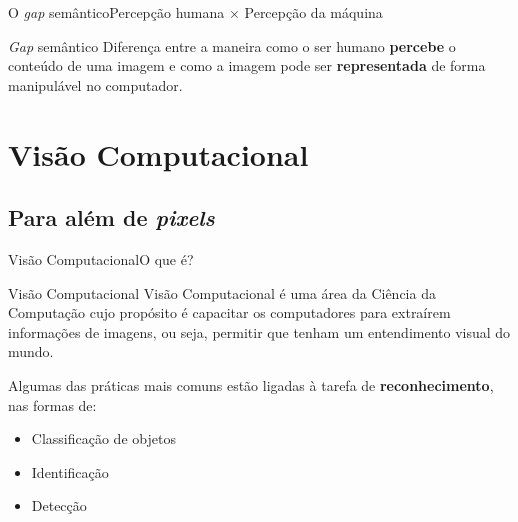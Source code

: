 \documentclass{beamer}
\begin{document}
    \begin{frame}{O \emph{gap} semântico}{Percepção humana $\times$ Percepção da máquina}

        \begin{block}{\emph{Gap} semântico}
            Diferença entre a maneira como o ser humano \textbf{percebe} o conteúdo de uma imagem
            e como a imagem pode ser \textbf{representada} de forma manipulável no computador.
        \end{block}
    
    \end{frame}

\section{Visão Computacional}

    \subsection{Para além de \emph{pixels}}

    \begin{frame}{Visão Computacional}{O que é?}

        \begin{block}{Visão Computacional}
        Visão Computacional é uma área da Ciência da Computação
        cujo propósito é capacitar os computadores para extraírem
        informações de imagens, ou seja, permitir que tenham
        um entendimento visual do mundo.
        \end{block}

        \pause

        Algumas das práticas mais comuns 
        estão ligadas à tarefa de \textbf{reconhecimento}, nas formas de:
        \pause
        \begin{itemize}
            \item<1-> Classificação de objetos
            \item<2-> Identificação
            \item<3-> Detecção
        \end{itemize}

    \end{frame}
\end{document}
